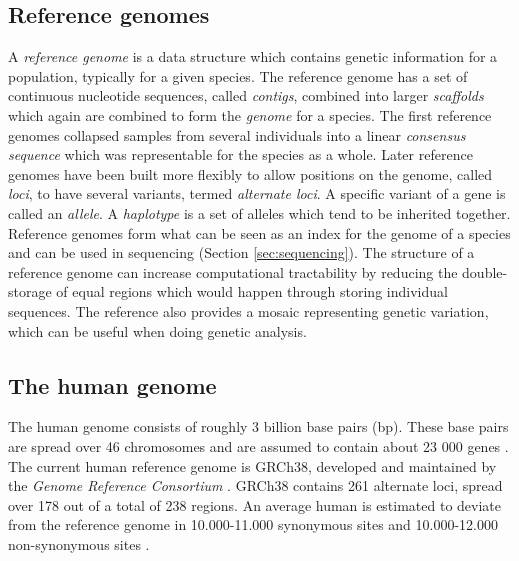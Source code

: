 \documentclass[thesis.tex]{subfiles}
\begin{document}
\subsection{Reference genomes}
A \textit{reference genome} is a data structure which contains genetic information for a population, typically for a given species. The reference genome has a set of continuous nucleotide sequences, called \textit{contigs}, combined into larger \textit{scaffolds} which again are combined to form the \textit{genome} for a species. The first reference genomes collapsed samples from several individuals into a linear \textit{consensus sequence} which was representable for the species as a whole. Later reference genomes have been built more flexibly to allow positions on the genome, called \textit{loci}, to have several variants, termed \textit{alternate loci}. A specific variant of a gene is called an \textit{allele}. A \textit{haplotype} is a set of alleles which tend to be inherited together. Reference genomes form what can be seen as an index for the genome of a species and can be used in sequencing (Section \ref{sec:sequencing}). The structure of a reference genome can increase computational tractability by reducing the double-storage of equal regions which would happen through storing individual sequences. The reference also provides a mosaic representing genetic variation, which can be useful when doing genetic analysis.\\
\par\noindent
\subsection{The human genome}
\label{sec:human_genome}
The human genome consists of roughly 3 billion base pairs (bp). These base pairs are spread over 46 chromosomes and are assumed to contain about 23 000 genes \cite{introduction_to_genomics}. The current human reference genome is GRCh38\cite{grch38}, developed and maintained by the \textit{Genome Reference Consortium} \cite{genome_reference_consortium}. GRCh38 contains 261 alternate loci, spread over 178 out of a total of 238 regions. An average human is estimated to deviate from the reference genome in 10.000-11.000 synonymous sites and 10.000-12.000 non-synonymous sites \cite{a_map_of_human_genome_variation_from_population_scale_sequencing}.
\end{document}
